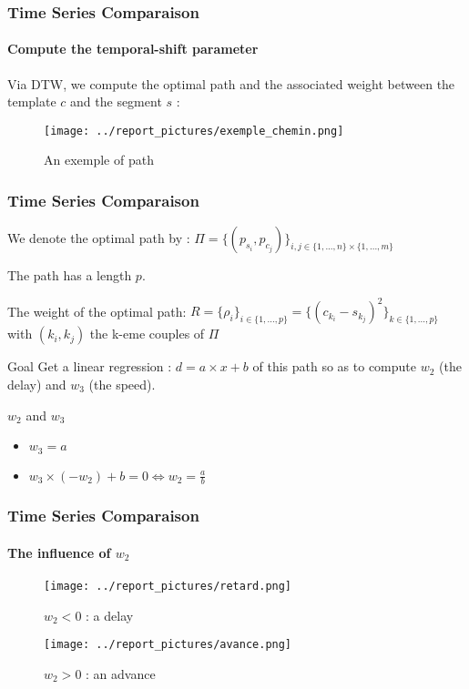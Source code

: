 \documentclass[11pt, sans, handout]{beamer}
\begin{document}
\begin{frame}
	\frametitle{Time Series Comparaison}
	\framesubtitle{Compute the temporal-shift parameter}
	
	Via DTW, we compute the optimal path and the associated weight between the template $c$ and the segment $s$ :
	
	\begin{figure}[H]
		\centering
		\texttt{[image: ../report\_pictures/exemple\_chemin.png]}
		\caption{An exemple of path}
		\label{ex_dist_rep}
	\end{figure}
	
\end{frame}

\begin{frame}
	\frametitle{Time Series Comparaison}
	
	We denote the optimal path by : $\Pi = \{(p_{s_i}, p_{c_j})\}_{i,j \in \{1, ..., n\} \times \{1, ..., m\} }$
	
	The path has a length $p$.
	
	The weight of the optimal path: $R = \{ \rho_i \}_{i \in \{1, ..., p\} } = \{ (c_{k_i} - s_{k_j})^2 \}_{k \in \{1, ..., p\} }$ with $(k_i,k_j)$ the k-eme couples of $\Pi$
	
	\begin{alertblock}{Goal}
		Get a linear regression : $d = a \times x + b$ of this path so as to compute $w_2$ (the delay) and $w_3$ (the speed).
	\end{alertblock}	
	
	\begin{block}{$w_2$ and $w_3$}
	\begin{itemize}
		\item $w_3=a$
		\item $w_3 \times (-w_2) + b = 0 \Leftrightarrow w_2 = \frac{a}{b}$
	\end{itemize}
	\end{block}
	
\end{frame}

\begin{frame}
	\frametitle{Time Series Comparaison}
	\framesubtitle{The influence of $w_2$}

	\begin{figure}
   	\begin{minipage}[c]{.46\linewidth}
      \texttt{[image: ../report\_pictures/retard.png]}
      \caption{$w_2 < 0$ : a delay}
   	\end{minipage} \hfill
   	\begin{minipage}[c]{.46\linewidth}
      \texttt{[image: ../report\_pictures/avance.png]}
      \caption{$w_2 > 0$ : an advance}
  	\end{minipage}
	\end{figure}

\end{frame}
\end{document}
